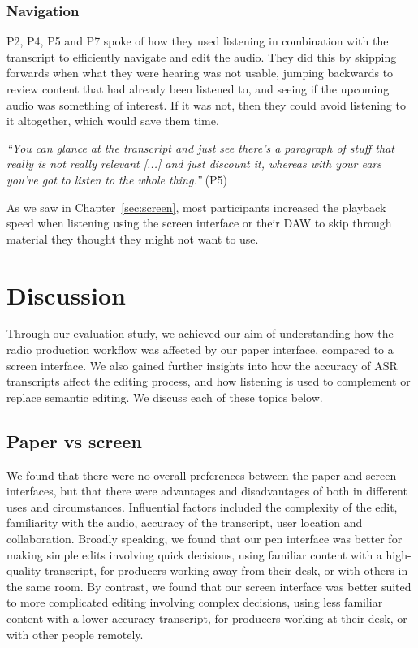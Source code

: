 \subsubsection{Navigation}



P2, P4, P5 and P7 spoke of how they used listening in combination with the transcript to efficiently navigate and edit
the audio. They did this by skipping forwards when what they were hearing was not usable, jumping backwards to review
content that had already been listened to, and seeing if the upcoming audio was something of interest.  If it was not,
then they could avoid listening to it altogether, which would save them time.

\textit{``You can glance at the transcript and just see there's a paragraph of stuff that really is not really relevant
[...] and just discount it, whereas with your ears you've got to listen to the whole thing.''} (P5) 

As we saw in Chapter~\ref{sec:screen}, most participants increased the playback speed when listening using the screen
interface or their DAW to skip through material they thought they might not want to use.




\section{Discussion}\label{sec:paper-discussion}

Through our evaluation study, we achieved our aim of understanding how the radio production workflow was affected by
our paper interface, compared to a screen interface. We also gained further insights into how the accuracy of ASR
transcripts affect the editing process, and how listening is used to complement or replace semantic editing.
We discuss each of these topics below.












\subsection{Paper vs screen}


We found that there were no overall preferences between the paper and screen interfaces, but that there were
advantages and disadvantages of both in different uses and circumstances. Influential factors included the complexity
of the edit, familiarity with the audio, accuracy of the transcript, user location and collaboration.  Broadly speaking,
we found that our pen interface was better for making simple edits involving quick decisions, using familiar content
with a high-quality transcript, for producers working away from their desk, or with others in the same room.  By
contrast, we found that our screen interface was better suited to more complicated editing involving complex decisions,
using less familiar content with a lower accuracy transcript, for producers working at their desk, or with other people
remotely.

